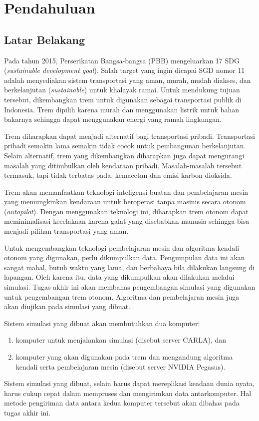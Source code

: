 \chapter{Pendahuluan}

\section{Latar Belakang}

Pada tahun 2015, Perserikatan Bangsa-bangsa (PBB) mengeluarkan 17 SDG
(\textit{sustainable development goal}). Salah target yang ingin dicapai SGD
nomor 11 adalah menyediakan sistem transportasi yang aman, murah, mudah diakses,
dan berkelanjutan (\textit{sustainable}) untuk khalayak ramai. Untuk mendukung
tujuan tersebut, dikembangkan trem untuk digunakan sebagai transportasi publik
di Indonesia. Trem dipilih karena murah dan menggunakan listrik untuk bahan
bakarnya sehingga dapat menggunakan energi yang ramah lingkungan.

Trem diharapkan dapat menjadi alternatif bagi transportasi pribadi. Transportasi
pribadi semakin lama semakin tidak cocok untuk pembangunan berkelanjutan. Selain
alternatif, trem yang dikembangkan diharapkan juga dapat mengurangi masalah yang
ditimbulkan oleh kendaraan pribadi. Masalah-masalah tersebut termasuk, tapi
tidak terbatas pada, kemacetan dan emisi karbon dioksida.

Trem akan memanfaatkan teknologi inteligensi buatan dan pembelajaran mesin yang
memungkinkan kendaraan untuk beroperasi tanpa masinis secara otonom
(\textit{autopilot}). Dengan menggunakan teknologi ini, diharapkan trem otonom
dapat meminimalisasi kecelakaan karena galat yang disebabkan manusia sehingga
bisa menjadi pilihan transportasi yang aman.

Untuk mengembangkan teknologi pembelajaran mesin dan algoritma kendali
o\-to\-nom yang digunakan, perlu dikumpulkan data. Pengumpulan data ini akan
sangat mahal, butuh waktu yang lama, dan berbahaya bila dilakukan langsung di
lapangan. Oleh karena itu, data yang dikumpulkan akan dilakukan melalui
simulasi. Tugas akhir ini akan membahas pengembangan simulasi yang digunakan
untuk pengembangan trem otonom. Algoritma dan pembelajaran mesin juga akan
diujikan pada simulasi yang dibuat.

Sistem simulasi yang dibuat akan membutuhkan dua komputer:
\begin{enumerate}
	\item komputer untuk menjalankan simulasi (disebut server CARLA), dan
	\item komputer yang akan digunakan pada trem dan mengandung algoritma
	      kendali serta pembelajaran mesin (disebut server NVIDIA Pegasus).
\end{enumerate}
Sistem simulasi yang dibuat, selain harus dapat mereplikasi keadaan dunia nyata,
harus cukup cepat dalam memproses dan mengirimkan data antarkomputer. Hal metode
pengiriman data antara kedua komputer tersebut akan dibahas pada tugas akhir
ini.

